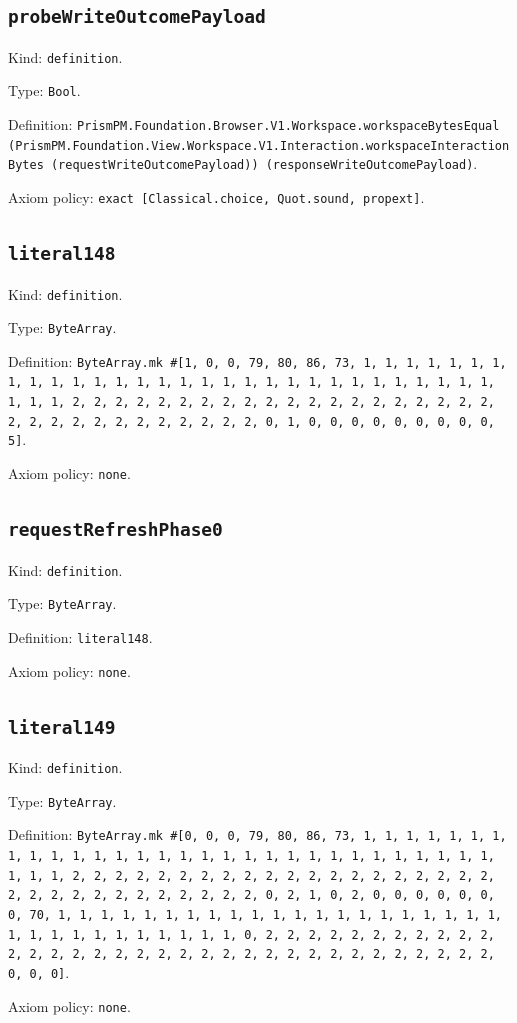 \documentclass[11pt]{article}
\begin{document}
\subsection*{\texttt{probeWriteOutcomePayload}}
\noindent Kind: \texttt{definition}.\par
\noindent Type: \texttt{Bool}.\par
\noindent Definition: \texttt{PrismPM.Foundation.Browser.V1.Workspace.workspaceBytesEqual (PrismPM.Foundation.View.Workspace.V1.Interaction.workspaceInteractionBytes (requestWriteOutcomePayload)) (responseWriteOutcomePayload)}.\par
\noindent Axiom policy: \texttt{exact [Classical.choice, Quot.sound, propext]}.\par
\subsection*{\texttt{literal148}}
\noindent Kind: \texttt{definition}.\par
\noindent Type: \texttt{ByteArray}.\par
\noindent Definition: \texttt{ByteArray.mk \#[1, 0, 0, 79, 80, 86, 73, 1, 1, 1, 1, 1, 1, 1, 1, 1, 1, 1, 1, 1, 1, 1, 1, 1, 1, 1, 1, 1, 1, 1, 1, 1, 1, 1, 1, 1, 1, 1, 1, 1, 2, 2, 2, 2, 2, 2, 2, 2, 2, 2, 2, 2, 2, 2, 2, 2, 2, 2, 2, 2, 2, 2, 2, 2, 2, 2, 2, 2, 2, 2, 2, 2, 0, 1, 0, 0, 0, 0, 0, 0, 0, 0, 0, 5]}.\par
\noindent Axiom policy: \texttt{none}.\par
\subsection*{\texttt{requestRefreshPhase0}}
\noindent Kind: \texttt{definition}.\par
\noindent Type: \texttt{ByteArray}.\par
\noindent Definition: \texttt{literal148}.\par
\noindent Axiom policy: \texttt{none}.\par
\subsection*{\texttt{literal149}}
\noindent Kind: \texttt{definition}.\par
\noindent Type: \texttt{ByteArray}.\par
\noindent Definition: \texttt{ByteArray.mk \#[0, 0, 0, 79, 80, 86, 73, 1, 1, 1, 1, 1, 1, 1, 1, 1, 1, 1, 1, 1, 1, 1, 1, 1, 1, 1, 1, 1, 1, 1, 1, 1, 1, 1, 1, 1, 1, 1, 1, 1, 2, 2, 2, 2, 2, 2, 2, 2, 2, 2, 2, 2, 2, 2, 2, 2, 2, 2, 2, 2, 2, 2, 2, 2, 2, 2, 2, 2, 2, 2, 2, 2, 0, 2, 1, 0, 2, 0, 0, 0, 0, 0, 0, 0, 70, 1, 1, 1, 1, 1, 1, 1, 1, 1, 1, 1, 1, 1, 1, 1, 1, 1, 1, 1, 1, 1, 1, 1, 1, 1, 1, 1, 1, 1, 1, 1, 1, 0, 2, 2, 2, 2, 2, 2, 2, 2, 2, 2, 2, 2, 2, 2, 2, 2, 2, 2, 2, 2, 2, 2, 2, 2, 2, 2, 2, 2, 2, 2, 2, 2, 2, 2, 0, 0, 0]}.\par
\noindent Axiom policy: \texttt{none}.\par
\end{document}
